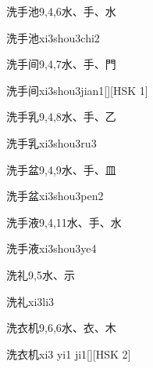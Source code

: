 \begin{entry}{洗手池}{9,4,6}{⽔、⼿、⽔}
  \begin{phonetics}{洗手池}{xi3shou3chi2}
  \end{phonetics}
\end{entry}

\begin{entry}{洗手间}{9,4,7}{⽔、⼿、⾨}
  \begin{phonetics}{洗手间}{xi3shou3jian1}[][HSK 1]
  \end{phonetics}
\end{entry}

\begin{entry}{洗手乳}{9,4,8}{⽔、⼿、⼄}
  \begin{phonetics}{洗手乳}{xi3shou3ru3}
  \end{phonetics}
\end{entry}

\begin{entry}{洗手盆}{9,4,9}{⽔、⼿、⽫}
  \begin{phonetics}{洗手盆}{xi3shou3pen2}
  \end{phonetics}
\end{entry}

\begin{entry}{洗手液}{9,4,11}{⽔、⼿、⽔}
  \begin{phonetics}{洗手液}{xi3shou3ye4}
  \end{phonetics}
\end{entry}

\begin{entry}{洗礼}{9,5}{⽔、⽰}
  \begin{phonetics}{洗礼}{xi3li3}
  \end{phonetics}
\end{entry}

\begin{entry}{洗衣机}{9,6,6}{⽔、⾐、⽊}
  \begin{phonetics}{洗衣机}{xi3 yi1 ji1}[][HSK 2]
  \end{phonetics}
\end{entry}

